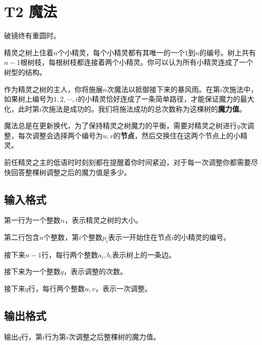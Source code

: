 \documentclass[12pt]{article}
\date{}
\begin{document}
\pagestyle{main}

\setcounter{section}{1}

\section{T2 魔法}

破镜终有重圆时。\par
精灵之树上住着$n$个小精灵，每个小精灵都有其唯一的一个$1$到$n$的编号。树上共有$n - 1$根树枝，每根树枝都连接着两个小精灵。你可以认为所有小精灵连成了一个树型的结构。\par
作为精灵之树的主人，你将施展$n$次魔法以抵御接下来的暴风雨。在第$i$次施法中，如果树上编号为$1, 2, \cdots , i$的小精灵恰好连成了一条简单路径，才能保证魔力的最大化，此时第$i$次施法是成功的。我们将施法成功的总次数称为这棵树的\textbf{魔力值}。\par
魔法总是在更新换代，为了保持精灵之树魔力的平衡，需要对精灵之树进行$q$次调整，每次调整会选择两个编号为$u, v$的\textbf{节点}，然后交换住在这两个节点上的小精灵。\par
前任精灵之主的低语时时刻刻都在提醒着你时间紧迫，对于每一次调整你都需要尽快回答整棵树调整之后的魔力值是多少。\par

\subsection{输入格式}

第一行为一个整数$n$，表示精灵之树的大小。\par
第二行包含$n$个整数，第$i$个整数$p_i$表示一开始住在节点$i$的小精灵的编号。\par
接下来$n - 1$行，每行两个整数$a_i, b_i$表示树上的一条边。\par
接下来为一个整数$q$，表示调整的次数。\par
接下来$q$行，每行两个整数$u, v$，表示一次调整。

\subsection{输出格式}

输出$q$行，第$i$行为第$i$次调整之后整棵树的魔力值。
\end{document}
